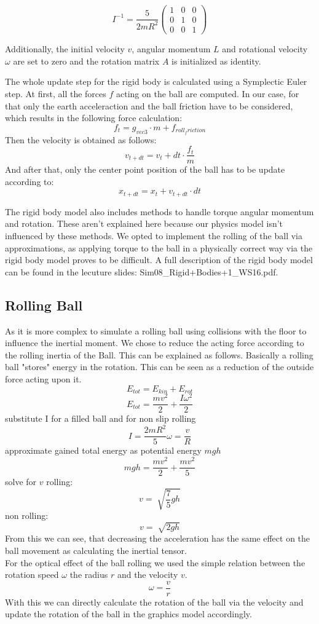 \documentclass[11pt,a4paper]{article}
\begin{document}
$$I^{-1} = \frac{5}{2mR^2}\begin{pmatrix}
1 & 0 & 0 \\ 
0 & 1 & 0 \\ 
0 & 0 & 1
\end{pmatrix}$$

Additionally, the initial velocity $v$, angular momentum $L$ and rotational velocity $\omega$ are set to zero and the rotation matrix $A$ is initialized as identity.

The whole update step for the rigid body is calculated using a Symplectic Euler step. At first, all the forces $f$ acting on the ball are computed. In our case, for that only the earth acceleraction and the ball friction have to be considered, which results in the following force calculation:
$$f_{t} = g_{vec3} \cdot m + f_{roll_friction}$$
Then the velocity is obtained as follows:
$$v_{t+dt} = v_{t} + dt \cdot \frac{f_{t}}{m}$$
And after that, only the center point position of the ball has to be update according to:
$$x_{t+dt} = x_{t} + v_{t+dt} \cdot dt$$

The rigid body model also includes methods to handle torque angular momentum and rotation. These aren't explained here because our physics model isn't influenced by these methods. We opted to implement the rolling of the ball via approximations, as applying torque to the ball in a physically correct way via the rigid body model proves to be difficult. A full description of the rigid body model can be found in the lecuture slides: Sim08\_Rigid+Bodies+1\_WS16.pdf.

\subsection{Rolling Ball}
\label{subsec:rollingBall}
As it is more complex to simulate a rolling ball using collisions with the floor to influence the inertial moment. We chose to reduce the acting force according to the rolling inertia of the Ball.
This can be explained as follows. Basically a rolling ball "stores" energy in the rotation. This can be seen as a reduction of the outside force acting upon it. 
$$E_{tot} = E_{kin}+E_{rot}$$
$$E_{tot} = \frac{m v^2}{2} +\frac{I\omega^2}{2} $$ 
substitute I for a filled ball and for non slip rolling
$$I=\frac{2mR^2}{5} \omega = \frac{v}{R}$$
approximate gained total energy as potential energy $mgh$
$$ mgh =  \frac{mv^2}{2}+\frac{mv^2}{5}$$
solve for $v$
rolling:
$$v=\sqrt[]{\frac{7}{5}gh}$$
non rolling:
$$v=\sqrt[]{2gh}$$
From this we can see, that decreasing the acceleration has the same effect on the ball movement as calculating the inertial tensor. 
\\
For the optical effect of the ball rolling we used the simple relation between the rotation speed $\omega$ the radius $r$ and the velocity $v$.
$$\omega = \frac{v}{r} $$
With this we can directly calculate the rotation of the ball via the velocity and update the rotation of the ball in the graphics model accordingly.
\end{document}
